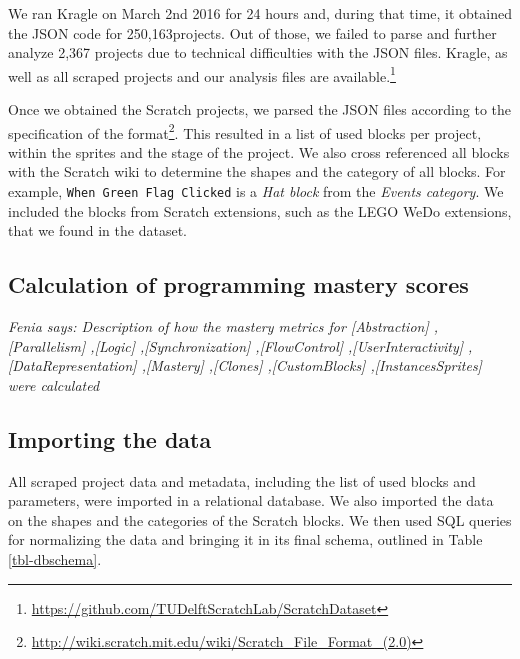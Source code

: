 \documentclass[10pt, conference]{IEEEtran}
\newcommand{\nPrograms}{250,163}
\newcommand{\fenia}[1]{\emph{\color{blue}Fenia says: #1}}
\begin{document}
We ran Kragle on March 2nd 2016 for 24 hours and, during that time, it obtained the JSON code for \nPrograms projects. Out of those, we failed to parse and further analyze 2,367 projects due to technical difficulties with the JSON files.
Kragle, as well as all scraped projects and our analysis files are available.\footnote{\label{repo}\url{https://github.com/TUDelftScratchLab/ScratchDataset}}

Once we obtained the Scratch projects, we parsed the JSON files according to the specification of the format\footnote{\url{http://wiki.scratch.mit.edu/wiki/Scratch_File_Format_(2.0)}}.
This resulted in a list of used blocks per project, within the sprites and the stage of the project.
We also cross referenced all blocks with the Scratch wiki to determine the shapes and the category of all blocks.
For example, \texttt{When Green Flag Clicked} is a \emph{Hat block} from the \emph{Events category}.
We included the blocks from Scratch extensions, such as the LEGO WeDo extensions, that we found in the dataset.

\subsection{Calculation of programming mastery scores}
\fenia{Description of how the mastery metrics for       
	[Abstraction]
	,[Parallelism]
	,[Logic]
	,[Synchronization]
	,[FlowControl]
	,[UserInteractivity]
	,[DataRepresentation]
	,[Mastery]
	,[Clones]
	,[CustomBlocks]
	,[InstancesSprites]
	were calculated}

\subsection{Importing the data}
\label{dataAnalysis}
All scraped project data and metadata, including the list of used blocks and parameters, were imported in a relational database.
We also imported the data on the shapes and the categories of the Scratch blocks.
We then used SQL queries for normalizing the data and bringing it in its final schema, outlined in Table \ref{tbl-dbschema}.
\end{document}
